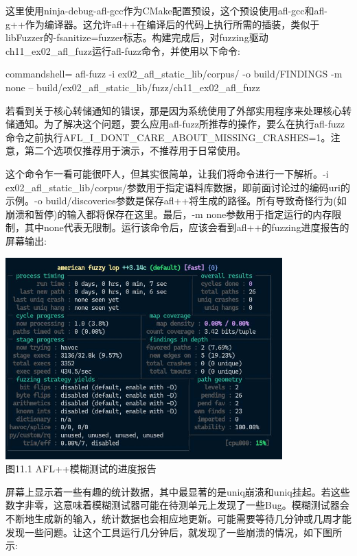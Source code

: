 这里使用ninja-debug-afl-gcc作为CMake配置预设，这个预设使用afl-gcc和afl-g++作为编译器。这允许afl++在编译后的代码上执行所需的插装，类似于libFuzzer的-fsanitize=fuzzer标志。构建完成后，对fuzzing驱动ch11\_ex02\_afl\_fuzz运行afl-fuzz命令，并使用以下命令:

\begin{tcblisting}{commandshell={}}
afl-fuzz -i ex02_afl_static_lib/corpus/ -o build/FINDINGS -m none
   -- build/ex02_afl_static_lib/fuzz/ch11_ex02_afl_fuzz
\end{tcblisting}

\begin{tcolorbox}[colback=yellow!5!white,colframe=yellow!75!black,title=重要的Note]
若看到关于核心转储通知的错误，那是因为系统使用了外部实用程序来处理核心转储通知。为了解决这个问题，要么应用afl-fuzz所推荐的操作，要么在执行afl-fuzz命令之前执行AFL\_I\_DONT\_CARE\_ABOUT\_MISSING\_CRASHES=1。注意，第二个选项仅推荐用于演示，不推荐用于日常使用。
\end{tcolorbox}

这个命令乍一看可能很吓人，但其实很简单，让我们将命令进行一下解析。-i ex02\_afl\_static\_lib/corpus/参数用于指定语料库数据，即前面讨论过的编码uri的示例。-o build/discoveries参数是保存afl++将生成的路径。所有导致奇怪行为(如崩溃和暂停)的输入都将保存在这里。最后，-m none参数用于指定运行的内存限制，其中none代表无限制。运行该命令后，应该会看到afl++的fuzzing进度报告的屏幕输出:

\begin{center}
\includegraphics[width=0.8\textwidth]{content/2/chapter11/images/1.jpg}\\
图11.1  AFL++模糊测试的进度报告
\end{center}

屏幕上显示着一些有趣的统计数据，其中最显著的是uniq崩溃和uniq挂起。若这些数字非零，这意味着模糊测试器可能在待测单元上发现了一些Bug。模糊测试器会不断地生成新的输入，统计数据也会相应地更新。可能需要等待几分钟或几周才能发现一些问题。让这个工具运行几分钟后，就发现了一些崩溃的情况，如下图所示:

